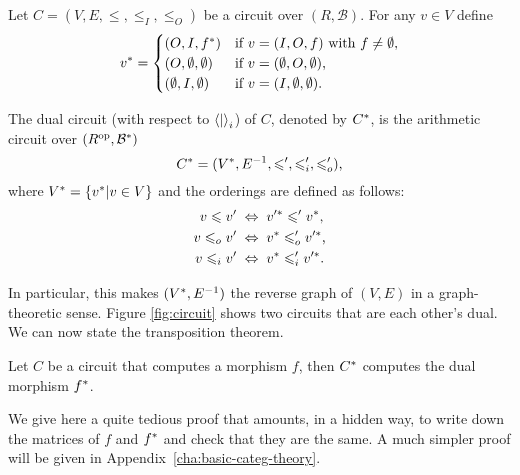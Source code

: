 \begin{definition}
  \label{def:dual}
  Let $C=(V,E,\le,\le_I,\le_O)$ be a circuit over
  $(R,\mathcal{B})$. For any $v\in V$ define
  \begin{equation}
    \label{eq:244}
    v^\ast =
    \begin{cases}
    (O,I,f^\ast)          &\text{if $v=(I,O,f)$ with $f\ne\emptyset$,}\\
    (O,\emptyset,\emptyset) &\text{if $v=(\emptyset,O,\emptyset)$,}\\
    (\emptyset,I,\emptyset) &\text{if $v=(I,\emptyset,\emptyset)$.}
    \end{cases}
  \end{equation}

  The dual circuit (with respect to $\left\langle  \middle|  \right\rangle_i$) of $C$, denoted
  by $C^\ast$, is the arithmetic circuit over
  $(R^{\mathrm{op}},\mathcal{B}^\ast)$
  \[C^\ast = (V^\ast, E^{-1},\leqslant',\leqslant_i',\leqslant_o')\text{,}\]
  where $V^\ast=\{v^\ast|v\in V\}$ and the orderings are defined
  as follows:
  \begin{align}
    v \leqslant v' \;&\Leftrightarrow\; v'^\ast \leqslant' v^\ast\text{,}\\
    v \leqslant_o v' \;&\Leftrightarrow\; v^\ast \leqslant_o' v'^\ast\text{,}\\
    v \leqslant_i v' \;&\Leftrightarrow\; v^\ast \leqslant_i' v'^\ast\text{.}
  \end{align}
\end{definition}

In particular, this makes $(V^\ast,E^{-1})$ the reverse graph of
$(V,E)$ in a graph-theoretic sense. Figure \ref{fig:circuit} shows two
circuits that are each other's dual. We can now state the
transposition theorem.

\begin{theorem}
  \label{th:tellegen}
  Let $C$ be a circuit that computes a morphism $f$, then $C^\ast$
  computes the dual morphism $f^\ast$.
\end{theorem}

We give here a quite tedious proof that amounts, in a hidden way, to
write down the matrices of $f$ and $f^\ast$ and check that they are
the same. A much simpler proof will be given in
Appendix~\ref{cha:basic-categ-theory}.

